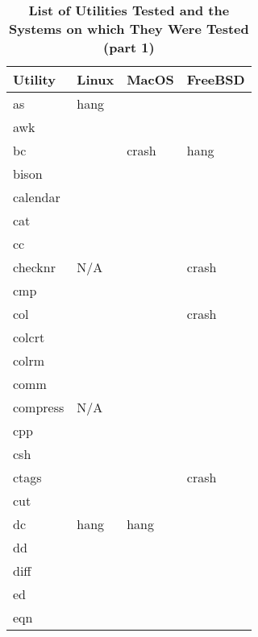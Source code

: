
\begin{table}[htbp]  %
\renewcommand\thetable{1}
\centering  %
 \begin{tabular}{|p{2.5cm}|p{2cm}|p{2cm}|p{2cm}|}  
     \hline
     \hline
        Utility & Linux & MacOS & FreeBSD \\ %
       \hline
       as & hang  &   &    \\
       awk &   &   &    \\
       bc &   & crash  & hang   \\
       bison &   &   &    \\
       calendar &   &   &    \\
       cat &   &   &    \\
       cc &   &   &    \\
       checknr & N/A  &   &  crash  \\
       cmp &   &   &    \\
       col &   &   &  crash  \\
       colcrt &   &   &    \\
       colrm &   &   &    \\
       comm &   &   &    \\
       compress & N/A  &   &    \\
       cpp &   &   &    \\
       csh &   &   &    \\
       ctags &   &   & crash   \\
       cut &   &   &   \\
       dc & hang  & hang  &    \\
       dd &   &   &    \\
       diff &   &   &    \\
       ed &   &   &    \\
       eqn &   &   &    \\
       \hline
       \hline
   \end{tabular}
   \caption{\textbf{List of Utilities Tested and the Systems on which They Were Tested (part 1)}}  %
\end{table}


